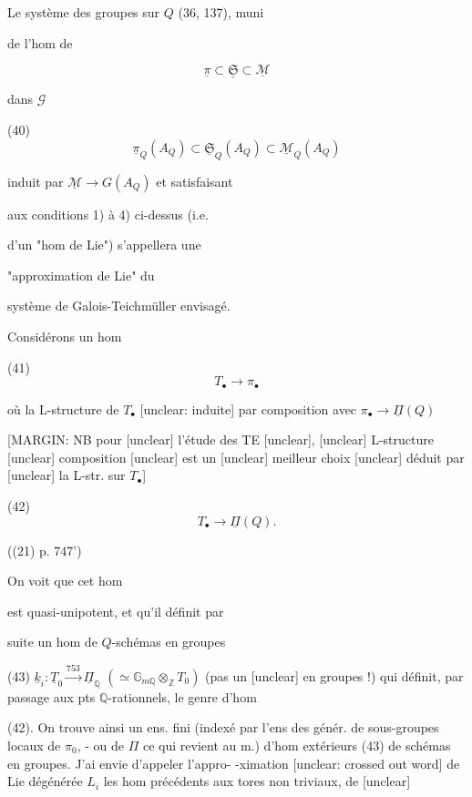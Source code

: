 \newpage


Le système des groupes sur $Q$ (36, 137), muni

de l'hom de

$$ \underline{\pi} \subset \underline{\mathfrak{S}} \subset \underline{\mathcal{M}} $$

dans $\mathcal{G}$

(40) $$ \underline{\pi}_Q(A_Q) \subset \underline{\mathfrak{S}}_Q(A_Q) \subset \underline{\mathcal{M}}_Q(A_Q) $$

induit par $\underline{\mathcal{M}} \to G(A_Q)$ et satisfaisant

aux conditions 1) à 4) ci-dessus (i.e.

d'un "hom de Lie") s'appellera une

"approximation de Lie" du

système de Galois-Teichmüller envisagé.

Considérons un hom

(41) $$ T_\bullet \to \pi_\bullet $$

où la L-structure de $T_\bullet$
[unclear: induite] par composition avec $\pi_\bullet \to \underline{\Pi}(Q)$

[MARGIN: NB pour [unclear] l'étude des TE [unclear], [unclear] L-structure [unclear] composition [unclear] est un [unclear] meilleur choix [unclear] déduit par [unclear] la L-str. sur $T_\bullet$]

(42) $$ T_\bullet \to \underline{\Pi}(Q) . $$

((21) p. 747')

On voit que cet hom

est quasi-unipotent, et qu'il définit par

suite un hom de $Q$-schémas en groupes

\newpage


(43) $\underline{k}_i : \underline{T}_0 \xrightarrow{753} \underline{\Pi}_{\mathbb{Q}}$
$(\simeq \mathbb{G}_{m\mathbb{Q}} \otimes_{\mathbb{Z}} T_0)$ (pas un [unclear] en groupes !)
qui définit, par passage aux pts $\mathbb{Q}$-rationnels, le genre d'hom

(42). On trouve ainsi un ens. fini
(indexé par l'ens des génér. de sous-groupes
locaux de $\pi_0$, - ou de $\Pi$ ce qui revient
au m.) d'hom extérieurs (43) de schémas
en groupes. J'ai envie d'appeler l'appro-
-ximation [unclear: crossed out word] de Lie dégénérée $L_i$
les hom précédents aux tores non
triviaux, de [unclear]

